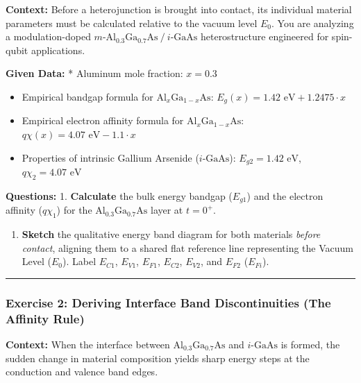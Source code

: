 \documentclass[
]{article}
\providecommand{\tightlist}{%
  \setlength{\itemsep}{0pt}\setlength{\parskip}{0pt}}
\begin{document}
\textbf{Context:} Before a heterojunction is brought into contact, its
individual material parameters must be calculated relative to the vacuum
level \(E_0\). You are analyzing a modulation-doped
\(m\text{-Al}_{0.3}\text{Ga}_{0.7}\text{As} \ /\  i\text{-GaAs}\)
heterostructure engineered for spin-qubit applications.

\textbf{Given Data:} * Aluminum mole fraction: \(x = 0.3\)

\begin{itemize}
  \item Empirical bandgap formula for $\text{Al}_x\text{Ga}_{1-x}\text{As}$: $E_g(x) = 1.42\text{ eV} + 1.2475 \cdot x$
  \item Empirical electron affinity formula for $\text{Al}_x\text{Ga}_{1-x}\text{As}$: $q\chi(x) = 4.07\text{ eV} - 1.1 \cdot x$
  \item Properties of intrinsic Gallium Arsenide ($i\text{-GaAs}$): $E_{g2} = 1.42\text{ eV}$, $q\chi_2 = 4.07\text{ eV}$
\end{itemize}

\textbf{Questions:} 1. \textbf{Calculate} the bulk energy bandgap
(\(E_{g1}\)) and the electron affinity (\(q\chi_1\)) for the
\(\text{Al}_{0.3}\text{Ga}_{0.7}\text{As}\) layer at \(t=0^+\).

\begin{enumerate}
\def\labelenumi{\arabic{enumi}.}
\setcounter{enumi}{1}
\tightlist
\item
  \textbf{Sketch} the qualitative energy band diagram for both materials
  \emph{before contact}, aligning them to a shared flat reference line
  representing the Vacuum Level (\(E_0\)). Label \(E_{C1}\), \(E_{V1}\),
  \(E_{F1}\), \(E_{C2}\), \(E_{V2}\), and \(E_{F2}\) (\(E_{Fi}\)).
\end{enumerate}

\begin{center}\rule{0.5\linewidth}{0.5pt}\end{center}

\subsubsection{Exercise 2: Deriving Interface Band Discontinuities (The
Affinity
Rule)}\label{exercise-2-deriving-interface-band-discontinuities-the-affinity-rule}

\textbf{Context:} When the interface between
\(\text{Al}_{0.3}\text{Ga}_{0.7}\text{As}\) and \(i\text{-GaAs}\) is
formed, the sudden change in material composition yields sharp energy
steps at the conduction and valence band edges.
\end{document}
